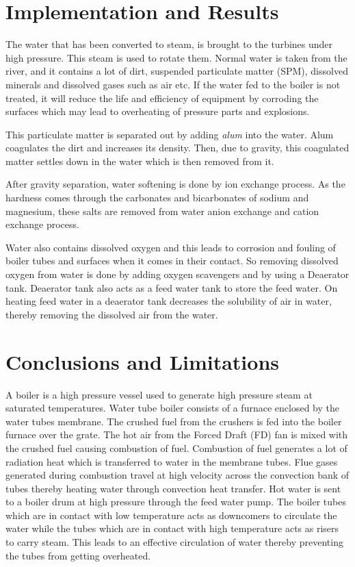 \documentclass[12pt]{report}
\begin{document}
\section{Implementation and Results}
The water that has been converted to steam, is brought to the turbines under high pressure. This steam is used to rotate them. Normal water is taken from the river, and it contains a lot of dirt, suspended particulate matter (SPM), dissolved minerals and dissolved gases such as air etc. If the water fed to the boiler is not treated, it will reduce the life and efficiency of equipment by corroding the surfaces which may lead to overheating of pressure parts and explosions. \par This particulate matter is separated out by adding {\it alum} into the water. Alum coagulates the dirt and increases its density. Then, due to gravity, this coagulated matter settles down in the water which is then removed from it. 


\par After gravity separation, water softening is done by ion exchange process. As the hardness comes through the carbonates and bicarbonates of sodium and magnesium, these salts are removed from water anion exchange and cation exchange process. \par Water also contains dissolved oxygen and this leads to corrosion and fouling of boiler tubes and surfaces when it comes in their contact. So removing dissolved oxygen from water is done by adding oxygen scavengers and by using a Deaerator tank. Deaerator tank also acts as a feed water tank to store the feed water. On heating feed water in a deaerator tank decreases the solubility of air in water, thereby removing the dissolved air from the water.
\section{Conclusions and Limitations}
A boiler is a high pressure vessel used to generate high pressure steam at saturated temperatures. Water tube boiler consists of a furnace enclosed by the water tubes membrane. The crushed fuel from the crushers is fed into the boiler furnace over the grate. The hot air from the Forced Draft (FD) fan is mixed with the crushed fuel causing combustion of fuel.
Combustion of fuel generates a lot of radiation heat which is transferred to water in the membrane tubes. Flue gases generated during combustion travel at high velocity across the convection bank of tubes thereby heating water through convection heat transfer. Hot water is sent to a boiler drum at high pressure through the feed water pump. The boiler tubes which are in contact with low temperature acts as downcomers to circulate the water while the tubes which are in contact with high temperature acts as risers to carry steam. This leads to an effective circulation of water thereby preventing the tubes from getting overheated.
\end{document}
